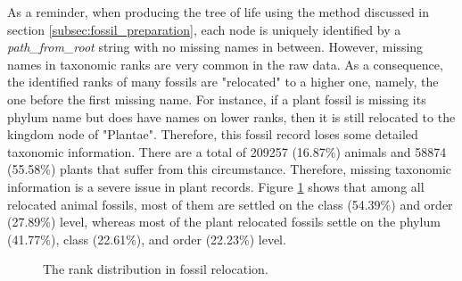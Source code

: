 \documentclass[11pt, a4paper,oneside,chapterprefix=false]{scrbook}
\begin{document}
As a reminder, when producing the tree of life using the method discussed in section \ref{subsec:fossil_preparation}, each node is uniquely identified by a \emph{path\_from\_root} string with no missing names in between. However, missing names in taxonomic ranks are very common in the raw data. As a consequence, the identified ranks of many fossils are "relocated" to a higher one, namely, the one before the first missing name. For instance, if a plant fossil is missing its phylum name but does have names on lower ranks, then it is still relocated to the kingdom node of "Plantae". Therefore, this fossil record loses some detailed taxonomic information. There are a total of 209257 (16.87\%) animals and 58874 (55.58\%) plants that suffer from this circumstance. Therefore, missing taxonomic information is a severe issue in plant records. Figure \ref{fig:relocation} shows that among all relocated animal fossils, most of them are settled on the class (54.39\%) and order (27.89\%) level, whereas most of the plant relocated fossils settle on the phylum (41.77\%), class (22.61\%), and order (22.23\%) level. 
\begin{figure}[h]
	\centering
	\hfill
	\caption{The rank distribution in fossil relocation.}
	\label{fig:relocation}
\end{figure}
\end{document}
